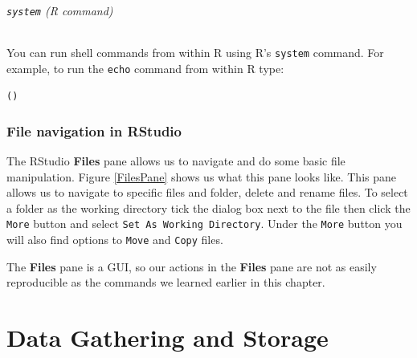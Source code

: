 \documentclass[krantz1]{krantz}
\begin{document}
\paragraph{{\tt{system}} (R command)}\label{systemRcommand}

You can run shell commands from within R using R's \texttt{system} command. For example, to run the \texttt{echo} command from within R type:

\begin{knitrout}
\color{fgcolor}\begin{kframe}
\begin{alltt}
()
\end{alltt}
\end{kframe}
\end{knitrout}



\section{File navigation in RStudio}

The RStudio \textbf{Files} pane allows us to navigate and do some basic file manipulation. Figure \ref{FilesPane} shows us what this pane looks like. This pane allows us to navigate to specific files and folder, delete and rename files. To select a folder as the working directory tick the dialog box next to the file then click the \texttt{More} button and select \texttt{Set As Working Directory}. Under the \texttt{More} button you will also find options to \texttt{Move} and \texttt{Copy} files.

The \textbf{Files} pane is a GUI, so our actions in the \textbf{Files} pane are not as easily reproducible as the commands we learned earlier in this chapter. 



\part{Data Gathering and Storage}
\end{document}
